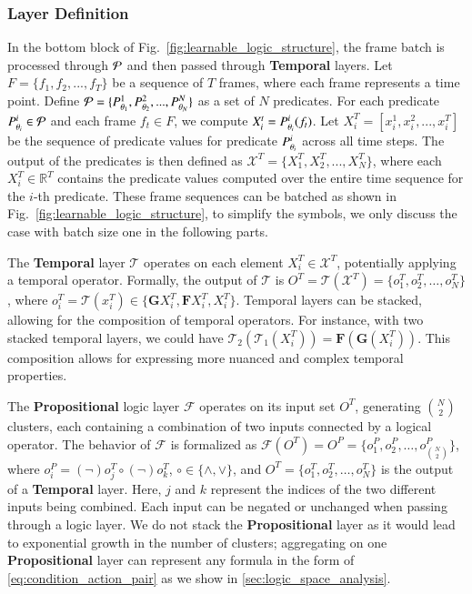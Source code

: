 \subsubsection{Layer Definition}
\label{sec:layer_definition}
In the bottom block of Fig.~\ref{fig:learnable_logic_structure}, the frame batch is processed through $\mathcal{P}$ and then passed through \textbf{Temporal} layers. Let $F = \{f_1, f_2, ..., f_T\}$ be a sequence of $T$ frames, where each frame represents a time point. Define $\mathcal{P} = \{P^{1}_{\theta_1}, P^{2}_{\theta_2}, ..., P^{N}_{\theta_N}\}$ as a set of $N$ predicates. For each predicate $P^{i}_{\theta_i} \in \mathcal{P}$ and each frame $f_t \in F$, we compute $X_i^t = P^{i}_{\theta_i}(f_t)$. Let $X_i^T = [x_i^1, x_i^2, ..., x_i^T]$ be the sequence of predicate values for predicate $P^{i}_{\theta_i}$ across all time steps. The output of the predicates is then defined as $\mathcal{X}^T = \{X_1^T, X_2^T, ..., X_N^T\}$, where each $X_i^T \in \mathbb{R}^T$ contains the predicate values computed over the entire time sequence for the $i$-th predicate. These frame sequences can be batched as shown in Fig.~\ref{fig:learnable_logic_structure}, to simplify the symbols, we only discuss the case with batch size one in the following parts.

The \textbf{Temporal} layer $\mathcal{T}$ operates on each element $X_i^T \in \mathcal{X}^T$, potentially applying a temporal operator. Formally, the output of $\mathcal{T}$ is $ O^T  = \mathcal{T}(\mathcal{X}^T) = \{o^T_1, o^T_2, \ldots, o^T_N\}$, where $o^T_i = \mathcal{T}(x_i^T) \in \{\mathbf{G} X_i^T, \mathbf{F} X_i^T, X_i^T\}$. Temporal layers can be stacked, allowing for the composition of temporal operators. For instance, with two stacked temporal layers, we could have $\mathcal{T}_2(\mathcal{T}_1(X_i^T)) = \mathbf{F}(\mathbf{G}(X_i^T))$. This composition allows for expressing more nuanced and complex temporal properties.

The \textbf{Propositional} logic layer $\mathcal{F}$ operates on its input set $O^T$, generating ${N \choose 2}$ clusters, each containing a combination of two inputs connected by a logical operator. The behavior of $\mathcal{F}$ is formalized as $\mathcal{F}(O^T) = O^P = \{o_1^P, o_2^P, \ldots, o_{N \choose 2}^P\}$, where $o_i^P = (\lnot) o_j^T \circ (\lnot) o_k^T$, $\circ \in \{\land, \lor\}$, and $O^T = \{o^T_1, o^T_2, \ldots, o^T_N\}$ is the output of a \textbf{Temporal} layer. Here, $j$ and $k$ represent the indices of the two different inputs being combined. Each input can be negated or unchanged when passing through a logic layer. We do not stack the \textbf{Propositional} layer as it would lead to exponential growth in the number of clusters; aggregating on one \textbf{Propositional} layer can represent any formula in the form of \eqref{eq:condition_action_pair} as we show in \ref{sec:logic_space_analysis}.

